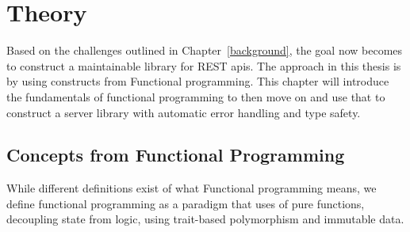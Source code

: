 \chapter{Theory}\label{theory} 

Based on the challenges outlined in Chapter~\ref{background}, the goal now
becomes to construct a maintainable library for REST apis. The approach in this
thesis is by using constructs from Functional programming. This chapter will
introduce the fundamentals of functional programming to then move on and use
that to construct a server library with automatic error handling and type
safety.

\section{Concepts from Functional Programming}\label{functionalprogramming}

 While different definitions exist of what Functional programming means, we
 define functional programming as a paradigm that uses of pure functions,
 decoupling state from logic, using trait-based polymorphism and immutable data.

